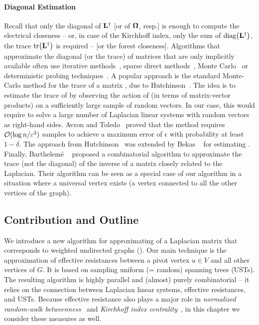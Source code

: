 \paragraph{Diagonal Estimation}
Recall that only the diagonal of $\mathbf{L}^\dagger$ [or of $\bm{\Omega}$, resp.] is enough to
compute the electrical closeness -- or, in case of the Kirchhoff index, only
the sum of $\diag{\Linv}$, \ie the trace $\tr{\Linv}$ is required -- [or the
forest closeness].
%
Algorithms that approximate the diagonal (or the trace) of matrices that are
only implicitly available often use iterative
methods~\cite{DBLP:journals/na/SidjeS11}, sparse direct
methods~\cite{DBLP:journals/siamsc/AmestoyDLR15,DBLP:journals/pc/Jacquelin0018},
Monte Carlo~\cite{hutchinson1989stochastic} or deterministic probing
techniques~\cite{bekas2007estimator,bekas2007estimator}.
%
A popular approach is the standard Monte-Carlo method for the trace of a matrix , due to
Hutchinson~\cite{hutchinson1989stochastic}. The idea is to estimate the trace of  by
observing the action of  (in terms of matrix-vector products) on a sufficiently large
sample of random vectors. In our case, this would require to solve a large number of Laplacian
linear systems with random vectors as right-hand sides. Avron and Toledo~\cite{DBLP:journals/jacm/AvronT11}
proved that the method requires $\mathcal{O}(\log n /\varepsilon^2)$ samples to achieve a maximum error
of $\epsilon$ with probability at least $1 - \delta$. The approach from Hutchinson~\cite{hutchinson1989stochastic}
was extended by Bekas \etal~\cite{bekas2007estimator} for estimating .
Finally, Barthelem\'e \etal~\cite{barthelme2019estimating} proposed a combinatorial algorithm to
approximate the trace (not the diagonal) of the inverse of a matrix closely related to the Laplacian.
Their algorithm can be seen as a special case of our algorithm in a situation where a universal
vertex exists (\ie a vertex connected to all the other vertices of the graph).

\subsection{Contribution and Outline}
We introduce a new algorithm for approximating \diag{\Linv} of a Laplacian matrix \Lapl
that corresponds to weighted undirected graphs (). Our main technique
is the approximation of effective resistances between a pivot vertex $u\in V$ and
all other vertices of $G$.
It is based on sampling uniform (= random) spanning trees (USTs).
The resulting algorithm is highly parallel and (almost) purely combinatorial -- it relies on the
connection between Laplacian linear systems, effective resistances, and USTs.
Because effective resistance also plays a major role in \emph{normalized
random-walk betweenness}~\cite{DBLP:conf/complexnetworks/NarayanS18}
and \emph{Kirchhoff index centrality}~\cite{DBLP:conf/soda/LiZ18}, in this
chapter we consider these measures as well.

